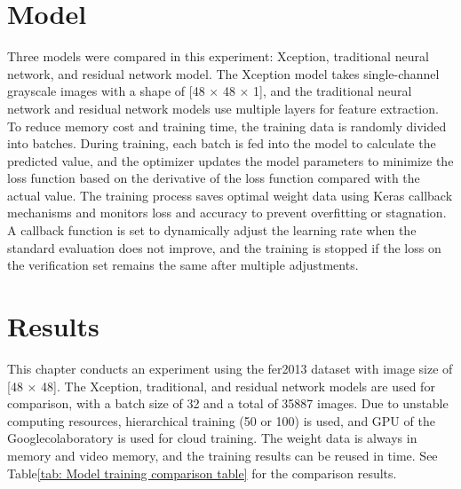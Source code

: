\documentclass[a0,portrait]{a0poster}
\begin{document}
\begin{multicols}{2}
\section*{Model}


Three models were compared in this experiment: Xception, traditional neural network, and residual network model\cite{b2}. The Xception model takes single-channel grayscale images with a shape of [48 × 48 × 1], and the traditional neural network and residual network models use multiple layers for feature extraction. To reduce memory cost and training time, the training data is randomly divided into batches. During training, each batch is fed into the model to calculate the predicted value, and the optimizer updates the model parameters to minimize the loss function based on the derivative of the loss function compared with the actual value. The training process saves optimal weight data using Keras callback mechanisms and monitors loss and accuracy to prevent overfitting or stagnation. A callback function is set to dynamically adjust the learning rate when the standard evaluation does not improve, and the training is stopped if the loss on the verification set remains the same after multiple adjustments.


\section*{Results}

\quad This chapter conducts an experiment using the fer2013 dataset with image size of [48 × 48]. The Xception, traditional, and residual network models are used for comparison, with a batch size of 32 and a total of 35887 images. Due to unstable computing resources, hierarchical training (50 or 100) is used, and GPU of the Googlecolaboratory is used for cloud training. The weight data is always in memory and video memory, and the training results can be reused in time. See Table\ref{tab: Model training comparison table} for the comparison results.

\begin{center}\vspace{1cm}
	\begin{tabular}{ccccccc}
		

\end{tabular}
\end{center}
\end{multicols}
\end{document}
